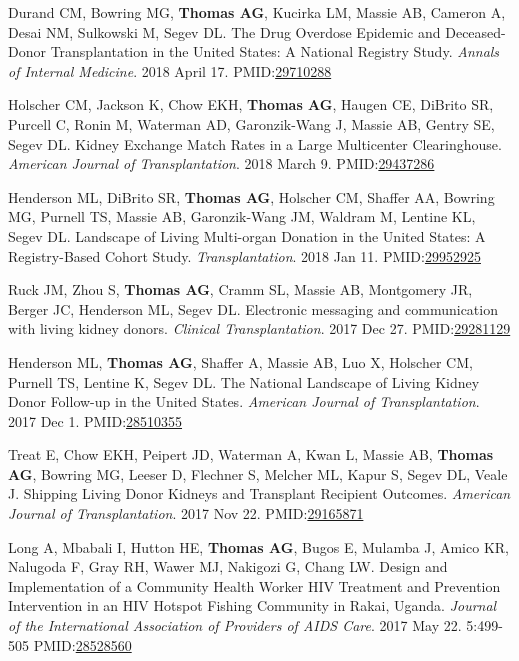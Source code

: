 \documentclass[10pt]{article}
\makeatletter
\newlength{\bibhang}
\newlength{\bibsep}
 {\@listi \global\bibsep\itemsep \global\advance\bibsep by\parsep}
\newenvironment{bibenum*}
  {\renewcommand\labelenumi{[\theenumi]}%
   \etaremune[
     topsep=0pt,
     itemsep=\bibsep,
     parsep=0pt,partopsep=0pt,
     itemindent=-\bibhang,
     leftmargin={\bibhang+\widthof{[999]}}]}
  {\endetaremune}
\newcommand{\pmid}[1]{PMID:\href{https://www.ncbi.nlm.nih.gov/pubmed/#1}{#1}}
\makeatother
\begin{document}
\begin{bibenum*}
\item Durand CM\dag, Bowring MG\dag, \textbf{Thomas AG}, Kucirka LM,
  Massie AB, Cameron A, Desai NM, Sulkowski M, Segev DL.
  The Drug Overdose Epidemic and Deceased-Donor Transplantation
  in the United States: A National Registry Study.
  \emph{Annals of Internal Medicine}. 2018 April 17.
  \pmid{29710288} 

\item Holscher CM, Jackson K, Chow EKH, \textbf{Thomas AG}, Haugen CE,
  DiBrito SR, Purcell C, Ronin M, Waterman AD, Garonzik-Wang J, Massie AB,
  Gentry SE, Segev DL. Kidney Exchange Match Rates in a Large
  Multicenter Clearinghouse.
  \emph{American Journal of Transplantation}. 2018 March 9.
  \pmid{29437286} 

\item Henderson ML\dag, DiBrito SR\dag, \textbf{Thomas AG}, Holscher CM,
  Shaffer AA, Bowring MG, Purnell TS, Massie AB, Garonzik-Wang JM,
  Waldram M, Lentine KL, Segev DL.  Landscape of Living Multi-organ
  Donation in the United States: A Registry-Based Cohort Study.
  \emph{Transplantation}. 2018 Jan 11.
  \pmid{29952925} 

\item Ruck JM, Zhou S, \textbf{Thomas AG}, Cramm SL, Massie AB,
  Montgomery JR, Berger JC, Henderson ML, Segev DL.
  Electronic messaging and communication with living kidney donors.
  \emph{Clinical Transplantation}. 2017 Dec 27.
  \pmid{29281129} 

\item Henderson ML\dag, \textbf{Thomas AG\dag}, Shaffer A, Massie AB, Luo X,
  Holscher CM, Purnell TS, Lentine K, Segev DL. The National Landscape
  of Living Kidney Donor Follow-up in the United States.
  \emph{American Journal of Transplantation}. 2017 Dec 1.
  \pmid{28510355} 

\item Treat E, Chow EKH, Peipert JD, Waterman A, Kwan L, Massie AB,
  \textbf{Thomas AG}, Bowring MG, Leeser D, Flechner S, Melcher ML, Kapur S,
  Segev DL, Veale J. Shipping Living Donor Kidneys and Transplant Recipient
  Outcomes.
  \emph{American Journal of Transplantation}. 2017 Nov 22.
  \pmid{29165871} 

\item Long A, Mbabali I, Hutton HE, \textbf{Thomas AG}, Bugos E,
  Mulamba J, Amico KR, Nalugoda F, Gray RH,
  Wawer MJ, Nakigozi G, Chang LW.
  Design and Implementation of a Community Health Worker HIV
  Treatment and Prevention Intervention in an HIV Hotspot
  Fishing Community in Rakai, Uganda. \emph{Journal of the International
  Association of Providers of AIDS Care}. 2017 May 22. 5:499-505
  \pmid{28528560} \\ 


\end{bibenum*}
\end{document}

